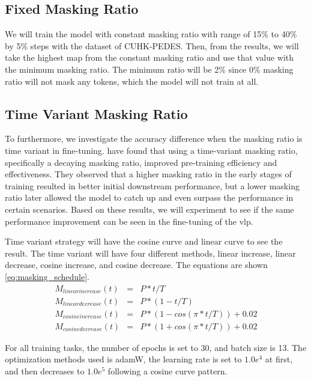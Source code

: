\subsection{Fixed Masking Ratio}
We will train the model with constant masking ratio with range of 15\% to 40\% by 5\% steps with the dataset of CUHK-PEDES. Then, from the results, we will take the highest \acrfull{map} from the constant masking ratio and use that value with the minimum masking ratio. The minimum ratio will be 2\% since 0\% masking ratio will not mask any tokens, which the model will not train at all. 


\subsection{Time Variant Masking Ratio}
To furthermore, we investigate the accuracy difference when the masking ratio is time variant in fine-tuning.
\cite{yang2023learningbettermaskingbetter} have found that using a time-variant masking ratio, specifically a decaying masking ratio, improved pre-training efficiency and effectiveness. They observed that a higher masking ratio in the early stages of training resulted in better initial downstream performance, but a lower masking ratio later allowed the model to catch up and even surpass the performance in certain scenarios. Based on these results, we will experiment to see if the same performance improvement can be seen in the fine-tuning of the \acrshort{vlp}.

Time variant strategy will have the cosine curve and linear curve to see the result. The time variant will have four different methods, linear increase, linear decrease, cosine increase, and cosine decrease. The equations are shown \ref{eq:masking_schedule}. 
\begin{eqnarray}
M_{linear increase}\left( t \right) &=& P*t/T \\
M_{linear decrease}\left( t \right) &=& P*\left(1-t/T\right) \\
M_{cosine increase}\left(t\right) &=& P*\left(1-cos\left(\pi*t/T\right)\right) + 0.02 \\
M_{cosine decrease}\left(t\right) &=& P*\left(1+cos\left(\pi*t/T\right)\right) + 0.02 
\label{eq:masking_schedule}
\end{eqnarray}

For all training tasks, the number of epochs is set to 30, and batch size is 13. The optimization methods used is adamW, the learning rate is set to $1.0e^4$ at first, and then decreases to $1.0e^5$ following a cosine curve pattern.


